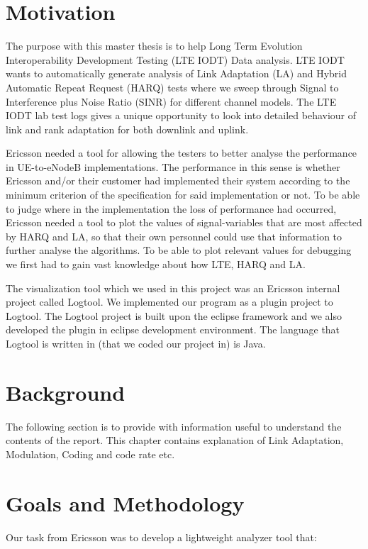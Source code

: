 \documentclass[cropmarks, frame, english]{idamasterthesis}
\begin{document}
\newpage
\section{Motivation}
The purpose with this master thesis is to help Long Term Evolution Interoperability Development Testing (LTE IODT) Data analysis. LTE IODT wants to automatically generate analysis of Link Adaptation (LA) and Hybrid Automatic Repeat Request (HARQ) tests where we sweep through Signal to Interference plus Noise Ratio (SINR) for different channel models. The LTE IODT lab test logs gives a unique opportunity to look into detailed behaviour of link and rank adaptation for both downlink and uplink. \newline


Ericsson needed a tool for allowing the testers to better analyse the performance in UE-to-eNodeB implementations. The performance in this sense is whether Ericsson and/or their customer had implemented their system according to the minimum criterion of the specification for said implementation or not. To be able to judge where in the implementation the loss of performance had occurred, Ericsson needed a tool to plot the values of signal-variables that are most affected by HARQ and LA, so that their own personnel could use that information to further analyse the algorithms. To be able to plot relevant values for debugging we first had to gain vast knowledge about how LTE, HARQ and LA. \newline


The visualization tool which we used in this project was an Ericsson internal project called Logtool. We implemented our program as a plugin project to Logtool. The Logtool project is built upon the eclipse framework and we also developed the plugin in eclipse development environment. The language that Logtool is written in (that we coded our project in) is Java. 
\section{Background}
The following section is to provide with information useful to understand the contents of the report. This chapter contains explanation of Link Adaptation, Modulation, Coding and code rate etc.


\section{Goals and Methodology}

Our task from Ericsson was to develop a lightweight analyzer tool that:
\end{document}
